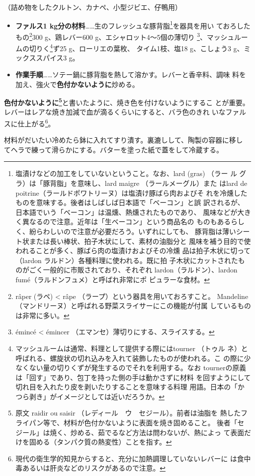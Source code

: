 \begin{recette}
（詰め物をしたクルトン、カナペ、小型ジビエ、仔鴨用）

\begin{itemize}
\item
  \textbf{ファルス1
  kg分の材料}\ldots{}\ldots{}生のフレッシュな豚背脂\footnote{塩漬けなどの加工をしていないということ。なお、lard
    (gras) （ラー ル グラ）は「豚背脂」を意味し、lard maigre
    （ラールメーグル）また はlard de
    poitrine（ラールドポワトリーヌ）は塩漬け豚ばら肉およびそ
    れを冷燻したものを意味する。後者はしばしば日本語で「ベーコン」と誤
    訳されるが、日本語でいう「ベーコン」は温燻、熱燻されたものであり、
    風味などが大きく異なるので注意。近年は「生ベーコン」という商品名の
    ものもあるらしく、紛らわしいので注意が必要だろう。いずれにしても、
    豚背脂は薄いシート状または長い棒状、拍子木状にして、素材の油脂分と
    風味を補う目的で使われることが多く、豚ばら肉の塩漬けおよびその冷燻
    品は拍子木状に切って（lardon ラルドン）各種料理に使われる。既に拍
    子木状にカットされたものがごく一般的に市販されており、それぞれ
    lardon（ラルドン）、lardon fumé（ラルドンフュメ）と呼ばれ非常にポ
    ピュラーな食材。}を器具を用い ておろしたもの\footnote{râper (ラペ)
    \textless{} râpe （ラープ）という器具を用いておろすこと。 Mandeline
    （マンドリーヌ）と呼ばれる野菜スライサーにこの機能が付属
    しているものは非常に多い。}300 g、鶏レバー600
  g、エシャロット4〜5個の薄切り \footnote{émincé \textless{} émincer
    （エマンセ）薄切りにする、スライスする。}、マッシュルームの切りく\footnote{マッシュルームは通常、料理として提供する際にはtourner
    （トゥル
    ネ）と呼ばれる、螺旋状の切れ込みを入れて装飾したものが使われる。こ
    の際に少なくない量の切りくずが発生するのでそれを利用する。なお
    tournerの原義は「回す」であり、包丁を持った側の手は動かさずに材料
    を回すようにして切れ目を入れたり皮を剥いたりすることを意味する料理
    用語。日本の「かつら剥き」がイメージとしては近いだろうか。}ず25
  g、ローリエの葉\undemi{}枚、 タイム1枝、塩18 g、こしょう3
  g、ミックススパイス3 g。
\item
  \textbf{作業手順}\ldots{}\ldots{}ソテー鍋に豚背脂を熱して溶かす。レバーと香辛料、調味
  料を加え、強火で\textbf{色付かないように}炒める。
\end{itemize}

\textbf{色付かないように\footnote{原文 raidir ou saisir
  （レディール　ウ　セジール）。前者は油脂を
  熱したフライパン等で、材料が色付かないように表面を焼き固めること。
  後者「セジール」は焼く、炒める、茹でるなど方法は問わないが、熱によっ
  て表面だけを固める（タンパク質の熱変性）ことを指す。}}と書いたように、焼き色を付けないようにするこ
とが重要。レバーはレアな焼き加減で血が滴るくらいにすると、バラ色のきれ
いなファルスに仕上がる\footnote{現代の衛生学的知見からすると、充分に加熱調理していないレバーに
  は食中毒あるいは肝炎などのリスクがあるので注意。}。

材料がだいたい冷めたら鉢に入れてすり潰す。裏漉しして、陶製の容器に移し
てヘラで練って滑らかにする。バターを塗った紙で蓋をして冷蔵する。
\end{recette}
